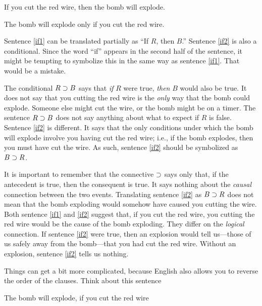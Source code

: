 \begin{earg}
\item[\ex{if1}] If you cut the red wire, then the bomb will explode.
\item[\ex{if2}] The bomb will explode only if you cut the red wire.
\end{earg}

Sentence \ref{if1} can be translated partially as ``If $R$, then $B$.'' Sentence \ref{if2} is also a conditional. Since the word ``if'' appears in the second half of the sentence, it might be tempting to symbolize this in the same way as sentence \ref{if1}. That would be a mistake.

The conditional $R\supset B$ says that \emph{if} $R$ were true, \emph{then} $B$ would also be true. It does not say that you cutting the red wire is the \emph{only} way that the bomb could explode. Someone else might cut the wire, or the bomb might be on a timer. The sentence $R\supset B$ does not say anything about what to expect if $R$ is false. Sentence \ref{if2} is different. It says that the only conditions under which the bomb will explode involve you having cut the red wire; i.e., if the bomb explodes, then you must have cut the wire. As such, sentence \ref{if2} should be symbolized as $B \supset R$.

It is important to remember that the connective $\supset$ says only that, if the antecedent is true, then the consequent is true. It says nothing about the \emph{causal} connection between the two events. Translating sentence \ref{if2} as $B \supset R$ does not mean that the bomb exploding would somehow have caused you cutting the wire. Both sentence \ref{if1} and \ref{if2} suggest that, if you cut the red wire, you cutting the red wire would be the cause of the bomb exploding. They differ on the \emph{logical} connection. If sentence \ref{if2} were true, then an explosion would tell us---those of us safely away from the bomb---that you had cut the red wire. Without an explosion, sentence \ref{if2} tells us nothing.


Things can get a bit more complicated, because English also allows you to reverse the order of the clauses. Think about this sentence

\begin{earg}
\item[\ex{if3}] The bomb will explode, if you cut the red wire
\end{earg}

